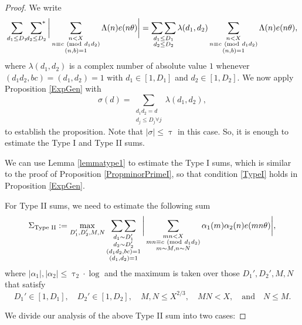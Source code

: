 \documentclass[12pt]{amsart}
\numberwithin{equation}{section}
\theoremstyle{remark}
\theoremstyle{definition}
\newcommand{\imod}[1]{\ (\mathrm{mod}\ #1)}
\begin{document}
\begin{proof}
We write
\begin{align}
\notag \sum_{d_1\leq D_1}\sideset{}{^*}\sum_{\substack{d_2\leq D_2}}\bigg\lvert \sum_{\substack{n< X\\n \equiv c \imod {d_1d_2}\\(n, b)=1}}\Lambda(n)e(n\theta)\bigg\rvert =\mathop{\sum\sum}_{\substack{d_1\leq D_1\\d_2\leq D_2}}\lambda(d_1, d_2)\sum_{\substack{n< X\\n \equiv c \imod {d_1d_2}\\(n, b)=1}}\Lambda(n)e(n\theta),
\end{align}
where $\lambda(d_1, d_2)$ is a complex number of absolute value $1$ whenever $( d_1d_2, bc)= (d_1, d_2)=1$ with $d_1\in [1, D_1]$ and $d_2\in [1, D_2]$. We now apply Proposition \ref{ExpGen} with \[{\sigma}(d)=\sum_{\substack{d_1d_2=d\\d_j\leq D_j\forall j}}\lambda(d_1, d_2),\] 
to establish the proposition. Note that $|{\sigma}| \leq \uptau$ in this case. So, it is enough to estimate the Type I and Type II sums. 

We can use Lemma \ref{lemmatype1} to estimate the Type I sums, which is similar to the proof of Proposition \ref{PropminorPrimeI}, so that condition \ref{TypeI} holds in Proposition \ref{ExpGen}. 

For Type II sums, we need to estimate the following sum
\begin{align}
\notag \Sigma_{\text{Type II}}:=\max_{\substack{D_1', D_2', M, N}}\mathop{\sum\sum}_{\substack{d_1\sim D_1'\\d_2\sim D_2'\\(d_1d_2, bc)=1\\(d_1,d_2)=1}}\bigg\lvert\sum_{\substack{mn<X\\mn\equiv c\imod {d_1d_2}\\m\sim M, n\sim N}}{\alpha}_1(m){\alpha}_2(n)e(mn\theta)\bigg\rvert,
\end{align}
where $|{\alpha}_1|, |{\alpha}_2|\leq \uptau_2 \cdot \log$ and the maximum is taken over those $D_1', D_2', M, N$ that satisfy
\begin{equation}\label{prop2eq1}
D_1'\in [1, D_1], \quad D_2'\in [1, D_2], \quad M, N\leq X^{2/3}, \quad  MN<X, \quad \text{and} \quad N\leq M.
\end{equation}

 We divide our analysis of the above Type II sum into two cases:


\end{proof}
\end{document}
